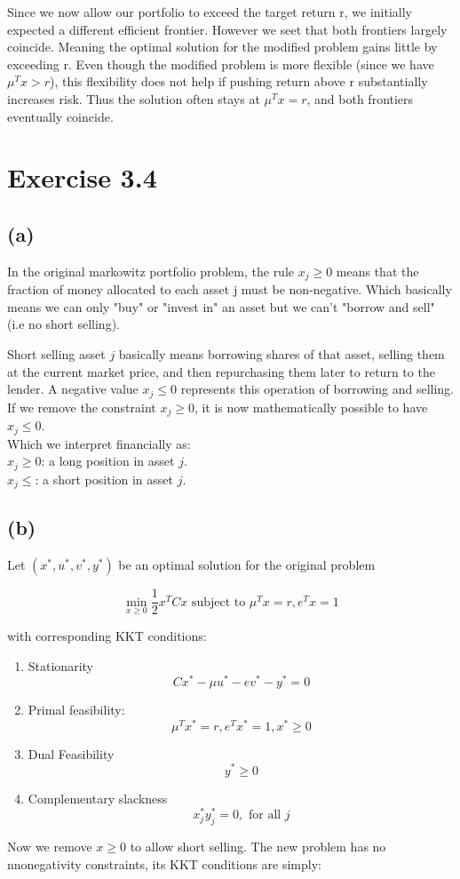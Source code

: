 \documentclass{assignment}
\begin{document}
Since we now allow our portfolio to exceed the target return r, we initially expected a different efficient frontier.
However we seet that both frontiers largely coincide. Meaning the optimal solution for the modified problem gains 
little by exceeding r. Even though the modified problem is more flexible (since we have $\mu^Tx >r$), this
flexibility does not help if pushing return above r substantially increases risk. Thus the solution often stays at
$\mu^T x= r$, and both frontiers eventually coincide. 


\section*{Exercise 3.4}

\subsection*{(a)}
In the original markowitz portfolio problem, the rule $x_j \geq 0$ means that the fraction of money allocated to each asset
j must be non-negative. Which basically means we can only "buy" or "invest in" an asset but we can't "borrow and sell" (i.e no short selling).

Short selling asset $j$ basically means borrowing shares of that asset, selling them at the current market price, and then 
repurchasing them later to return to the lender. A negative value $x_j \le 0$ represents this operation of borrowing and
selling. \\
If we remove the constraint $x_j \geq 0$, it is now mathematically possible to have $x_j \le 0$. \\
Which we interpret financially as: \\
$x_j \ge 0$: a long position in asset $j$. \\
$x_j \le$: a short position in asset $j$.
\subsection*{(b)}

Let $(x^*, u^*, v^*, y^*)$ be an optimal solution for the original problem

$$\min_{x \geq 0} \frac{1}{2} x^T C x \text{ subject to } \mu^Tx = r, e^Tx = 1$$

with corresponding KKT conditions:
\begin{enumerate}
    \item Stationarity  
        $$Cx^* - \mu u^* - ev^* - y^* = 0$$
    \item Primal feasibility: 
        $$\mu^T x^* = r, e^Tx^* = 1, x^*\geq 0$$
    \item Dual Feasibility
        $$y^* \geq 0$$
    \item Complementary slackness
        $$x^*_jy^*_j = 0, \text{ for all } j$$
\end{enumerate}
Now we remove $x \geq 0$ to allow short selling. The new problem has no nnonegativity constraints, its KKT conditions are simply:
\end{document}
